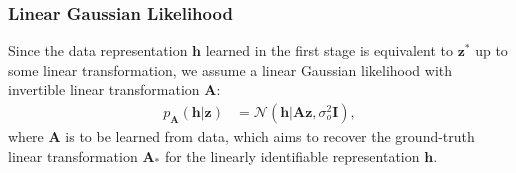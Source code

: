 \documentclass{article} %
\theoremstyle{plain}
\theoremstyle{definition}
\theoremstyle{remark}
\begin{document}
\subsubsection{Linear Gaussian Likelihood}
\vspace{-0.75ex}
Since the data representation $\mathbf{h}$ learned in the first stage is equivalent to $\mathbf{z}^*$ up to some linear transformation, we assume a linear Gaussian likelihood with invertible linear transformation $\mathbf{A}$:
\begin{align}\label{eq:s2-lkl}
    p_{\mathbf{A}}(\mathbf{h}|\mathbf{z}) & =\mathcal{N}(\mathbf{h}|\mathbf{A}\mathbf{z},\sigma_{o}^{2}\mathbf{I}),
\end{align}
where $\mathbf{A}$ is to be learned from data, which aims to recover the ground-truth linear transformation $\mathbf{A}_*$ for the linearly identifiable representation $\mathbf{h}$.

\vspace{-0.75ex}
\end{document}
